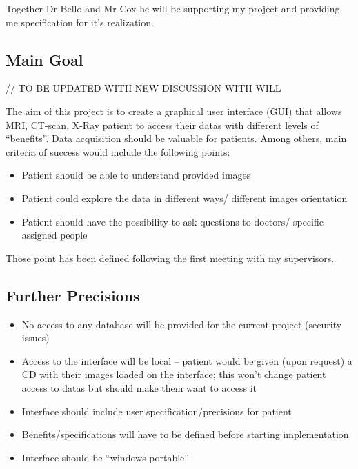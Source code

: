 \documentclass[12pt,twoside]{article}
\begin{document}
Together Dr Bello and Mr Cox he will be supporting my project and providing me specification for it's realization. \\


\subsection{Main Goal}


// TO BE UPDATED WITH NEW DISCUSSION WITH WILL

The aim of this project is to create a graphical user interface (GUI) that allows MRI, CT-scan, X-Ray patient to access their datas with different levels of “benefits”. Data acquisition should be valuable for patients. Among others, main criteria of success would include the following points:\\
\begin{itemize}
\item Patient should be able to understand provided images 
\item Patient could explore the data in different ways/ different images orientation
\item Patient should have the possibility to ask questions to doctors/ specific assigned people
\end{itemize}

Those point has been defined following the first meeting with my supervisors.

\subsection{Further Precisions}
\begin{itemize}
\item No access to any database will be provided for the current project (security issues) 
\item Access to the interface will be local – patient would be given (upon request) a CD with their images loaded on the interface; this won’t change patient access to datas but should make them want to access it
\item Interface should include user specification/precisions for patient 
\item Benefits/specifications will have to be defined before starting implementation
\item Interface should be “windows portable” 

\end{itemize}
\end{document}
